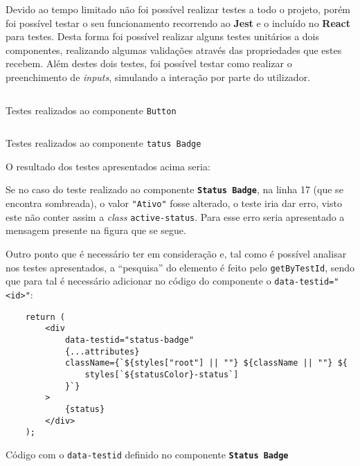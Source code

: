 \label{testsAttachments}

Devido ao tempo limitado não foi possível realizar testes a todo o projeto, porém foi possível testar o seu funcionamento recorrendo ao \textbf{Jest} e o \textit{} incluído no \textbf{React} para testes. Desta forma foi possível realizar alguns testes unitários a dois componentes, realizando algumas validações através das propriedades que estes recebem. Além destes dois testes, foi possível testar como realizar o preenchimento de \textit{inputs}, simulando a interação por parte do utilizador.

\begin{longlisting}
	\inputminted[]{jsx}{code/tests/button.test.tsx}
	\caption{Testes realizados ao componente \texttt{Button}}
\end{longlisting}

\begin{longlisting}
	\inputminted[highlightlines={17},highlightcolor=yellow!25]{jsx}{code/tests/status-badge.test.tsx}
	\caption{Testes realizados ao componente \texttt{tatus Badge}}
\end{longlisting}

O resultado dos testes apresentados acima seria:


Se no caso do teste realizado ao componente \textbf{\texttt{Status Badge}}, na linha 17 (que se encontra sombreada), o valor \texttt{"Ativo"} fosse alterado, o teste iria dar erro, visto este não conter assim a \textit{class} \texttt{active-status}. Para esse erro seria apresentado a mensagem presente na figura que se segue.


Outro ponto que é necessário ter em consideração e, tal como é possível analisar nos testes apresentados, a ``pesquisa'' do elemento é feito pelo \texttt{getByTestId}, sendo que para tal é necessário adicionar no código do componente o \texttt{data-testid="<id>"}:

\begin{longlisting}
	\begin{verbatim}
	return (
		<div
			data-testid="status-badge"
			{...attributes}
			className={`${styles["root"] || ""} ${className || ""} ${
				styles[`${statusColor}-status`]
			}`}
		>
			{status}
		</div>
	);
	\end{verbatim}
	\caption{Código com o \texttt{data-testid} definido no componente \textbf{\texttt{Status Badge}}}
\end{longlisting}


